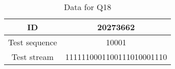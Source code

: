 \begin{table}[ht!]
	\centering
	\begin{tabular}{|c|c|}
		\hline
		ID            & 20273662                  \\ \hline
		Test sequence & 10001                     \\ \hline
		Test stream   & 1111110001100111010001110 \\ \hline
	\end{tabular}
	\caption{Data for Q18}
\end{table}\FloatBarrier

